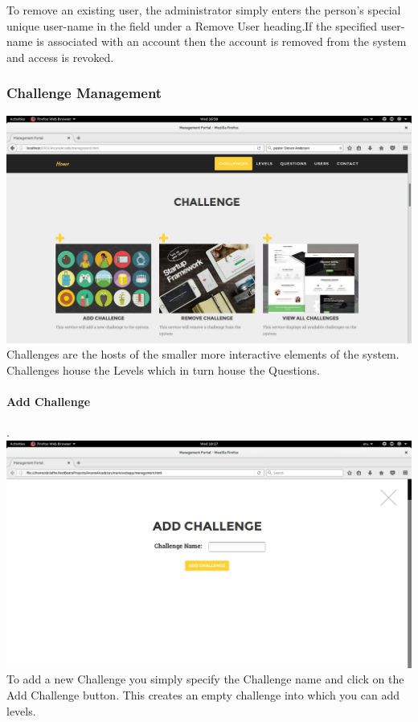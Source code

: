 \documentclass[english]{article}
\begin{document}
					To remove an existing user, the administrator simply enters the person's special unique user-name in the field under a Remove User heading.If the specified user-name is associated with an account then the account is removed from the system and access is revoked.
					\\[12pt]\newline
				
				
				
				
					
			
			
			
			\newpage	
			\subsubsection{Challenge Management}
				\includegraphics[width=\linewidth]{Challenge.png}				\newline
					Challenges are the hosts of the smaller more interactive elements of the system. Challenges house the Levels which in turn house the Questions.				\\[12pt]\newline

				\paragraph{Add Challenge}. \\ \newline
				\includegraphics[width=\linewidth]{AddChallenge.png}				\newline
To add a new Challenge you simply specify the Challenge name and click on the Add Challenge button. This creates an  empty challenge into which you can add levels.
				\\[12pt]\newline
\end{document}
